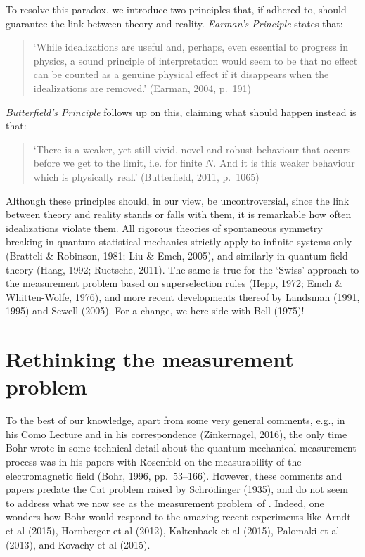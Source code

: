 \documentclass[12pt]{article}
\newcommand{\mmp}{measurement problem}
\begin{document}
To resolve this paradox, we introduce two principles that, if adhered to,  should guarantee the  link between theory and reality.
 \emph{Earman's Principle} states that:
\begin{quotation}
`While idealizations are useful and, perhaps, even essential to progress in physics, a sound principle of interpretation would seem to be that no effect  can be counted as  a genuine physical effect if it disappears
when the idealizations are removed.' \hfill (Earman, 2004, p.\ 191)
\end{quotation}
 \emph{Butterfield's Principle} follows up on this, claiming what should happen instead is that:
\begin{quotation}
`There is a weaker,
yet still vivid, novel and robust behaviour  that
occurs before we get to the limit, i.e. for finite $N$. And it is this weaker behaviour
which is physically real.' \hfill (Butterfield, 2011, p.\ 1065)
\end{quotation}
Although these principles should, in our view, be uncontroversial, since the link between theory and reality stands or falls with them, it is remarkable how often idealizations violate them. All rigorous theories of spontaneous symmetry breaking in quantum statistical mechanics strictly apply to infinite systems only (Bratteli \& Robinson, 1981;  Liu \& Emch, 2005), and similarly in quantum field theory (Haag, 1992; Ruetsche, 2011). The same is true for the `Swiss' approach to the measurement problem based on superselection rules (Hepp, 1972;  Emch \& Whitten-Wolfe, 1976), and more recent developments thereof by
 Landsman (1991, 1995) and Sewell (2005). For a change, we here side with Bell (1975)!
    \section{Rethinking the measurement problem}\label{mmp}
 To the best of our knowledge, apart from some very general comments, e.g., in his Como Lecture and in his correspondence (Zinkernagel, 2016), the only time Bohr wrote in some technical detail about  the quantum-mechanical measurement process was in his  papers with Rosenfeld on the measurability of the electromagnetic field (Bohr, 1996, pp.\ 53--166).  However, these comments and papers predate the Cat problem raised by Schr\"{o}dinger (1935),  and do not seem to address what we now see as the \mmp\ of \qm. Indeed, 
 one wonders how Bohr would respond to the amazing recent experiments like Arndt et al (2015), Hornberger et al (2012),  
 Kaltenbaek et al (2015),  Palomaki et al (2013), and  Kovachy et al (2015).
 
\end{document}
